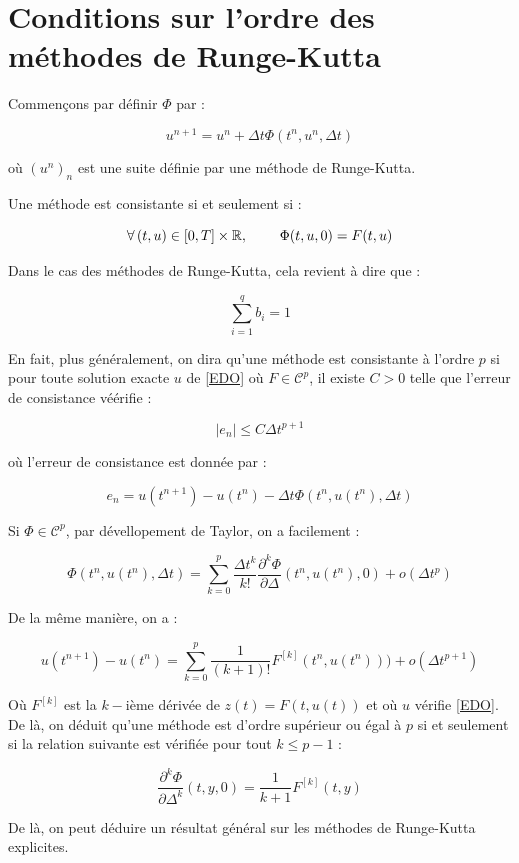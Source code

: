 \documentclass[10pt,a4paper]{amsart}
\begin{document}
\section{Conditions sur l'ordre des méthodes de Runge-Kutta}

Commençons par définir $\Phi$ par :

$$u^{n+1} = u^n  + \Delta t \Phi(t^n,u^n,\Delta t)$$

où $(u^n)_n$ est une suite définie par une méthode de Runge-Kutta.

Une méthode est consistante si et seulement si :

$$\forall \left( t, u \right) \in \left[ 0, T \right] \times \mathbb{R}, \hspace{0.8cm} \Phi(t,u,0) = F(t, u)$$

Dans le cas des méthodes de Runge-Kutta, cela revient à dire que :

$$\sum_{i=1}^q b_i = 1$$

En fait, plus généralement, on dira qu'une méthode est consistante à l'ordre $p$ si pour toute solution exacte $u$ de \eqref{EDO} où $F \in \mathcal{C}^p$, il existe $C > 0$ telle que l'erreur de consistance véérifie :

$$|e_n| \leq C \Delta t^{p+1}$$

où l'erreur de consistance est donnée par :

$$e_n = u(t^{n+1}) - u(t^n) - \Delta t \Phi(t^n,u(t^n),\Delta t)$$

Si $\Phi \in \mathcal{C}^p$, par dévellopement de Taylor, on a facilement :

$$\Phi(t^n,u(t^n),\Delta t) = \sum_{k=0}^{p} \dfrac{\Delta t^k}{k!} \dfrac{\partial^k \Phi}{\partial \Delta} (t^n, u(t^n), 0) + o \left( \Delta t^p  \right)$$

De la même manière, on a :

$$u(t^{n+1}) - u(t^n) = \sum_{k=0}^{p} \dfrac{1}{(k+1)!} F^{[k]}(t^n, u(t^n))) + o \left( \Delta t^{p+1}  \right)$$

Où $F^{[k]}$ est la $k-$ième dérivée de $z(t)=F(t, u(t))$ et où $u$ vérifie \eqref{EDO}. De là, on déduit qu'une méthode est d'ordre supérieur ou égal à $p$ si et seulement si la relation suivante est vérifiée pour tout $k \leq p-1$ :

\begin{equation}
\dfrac{\partial^k \Phi}{\partial \Delta^k} (t, y, 0) = \dfrac{1}{k+1}F^{[k]}(t,y)
\end{equation}

De là, on peut déduire un résultat général sur les méthodes de Runge-Kutta explicites.
\end{document}

